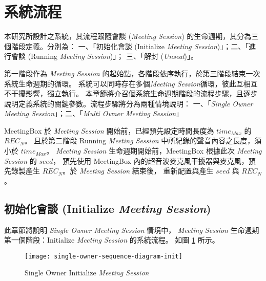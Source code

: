 \section{系統流程}

    本研究所設計之系統，其流程跟隨會談 ({\it Meeting Session}) 的生命週期，其分為三個階段定義。分別為：
一、「初始化會談 (Initialize {\it Meeting Session})」；二、「進行會談 (Running {\it Meeting Session})」；
三、「解封 ({\it Unseal})」。

    第一階段作為 {\it Meeting Session} 的起始點，各階段依序執行，於第三階段結束一次系統生命週期的循環。
系統可以同時存在多個{\it Meeting Session}循環，彼此互相互不干擾影響，獨立執行。
本章節將介召個系統生命週期階段的流程步驟，且逐步說明定義系統的關鍵參數。流程步驟將分為兩種情境說明：
一、「{\it Single Owner Meeting Session}」；二、「{\it Multi Owner Meeting Session}」

    MeetingBox 於 {\it Meeting Session} 開始前，已經預先設定時間長度為 $time_{Max}$ 的 $REC_{N}$。
且於第二階段 Running {\it Meeting Session} 中所紀錄的聲音內容之長度，須小於  $time_{Max}$。
{\it Meeting Session} 生命週期開始前，MeetingBox 根據此次 {\it Meeting Session} 的 $seed$，
預先使用 MeetingBox 內的超音波麥克風干擾器與麥克風，預先錄製產生 $REC_{N}$。於 {\it Meeting Session} 結束後，
重新配置與產生 $seed$ 與 $REC_{N}$。


\subsection{初始化會談 (Initialize {\it Meeting Session})}

    此章節將說明 {\it Single Owner Meeting Session} 情境中，
{\it Meeting Session} 生命週期第一個階段：Initialize {\it Meeting Session} 的系統流程。
如圖 \ref{fig.s-o-init} 所示。

\begin{figure}[H]
    \centering
    \texttt{[image: single-owner-sequence-diagram-init]}
    \caption{Single Owner Initialize {\it Meeting Session}}
    \label{fig.s-o-init}
\end{figure}

